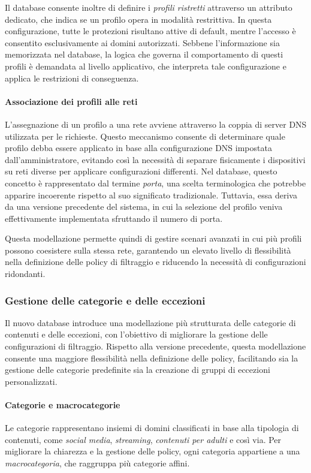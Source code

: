Il database consente inoltre di definire i \emph{profili ristretti} attraverso un attributo dedicato, che indica se un profilo opera in modalità restrittiva. In questa configurazione, tutte le protezioni risultano attive di default, mentre l’accesso è consentito esclusivamente ai domini autorizzati. Sebbene l’informazione sia memorizzata nel database, la logica che governa il comportamento di questi profili è demandata al livello applicativo, che interpreta tale configurazione e applica le restrizioni di conseguenza.

\paragraph{Associazione dei profili alle reti}
L’assegnazione di un profilo a una rete avviene attraverso la coppia di server DNS utilizzata per le richieste. Questo meccanismo consente di determinare quale profilo debba essere applicato in base alla configurazione DNS impostata dall’amministratore, evitando così la necessità di separare fisicamente i dispositivi su reti diverse per applicare configurazioni differenti. Nel database, questo concetto è rappresentato dal termine \emph{porta}, una scelta terminologica che potrebbe apparire incoerente rispetto al suo significato tradizionale. Tuttavia, essa deriva da una versione precedente del sistema, in cui la selezione del profilo veniva effettivamente implementata sfruttando il numero di porta.

Questa modellazione permette quindi di gestire scenari avanzati in cui più profili possono coesistere sulla stessa rete, garantendo un elevato livello di flessibilità nella definizione delle policy di filtraggio e riducendo la necessità di configurazioni ridondanti.

\subsubsection{Gestione delle categorie e delle eccezioni}
Il nuovo database introduce una modellazione più strutturata delle categorie di contenuti e delle eccezioni, con l'obiettivo di migliorare la gestione delle configurazioni di filtraggio. Rispetto alla versione precedente, questa modellazione consente una maggiore flessibilità nella definizione delle policy, facilitando sia la gestione delle categorie predefinite sia la creazione di gruppi di eccezioni personalizzati.

\paragraph{Categorie e macrocategorie}
Le categorie rappresentano insiemi di domini classificati in base alla tipologia di contenuti, come \emph{social media}, \emph{streaming}, \emph{contenuti per adulti} e così via. Per migliorare la chiarezza e la gestione delle policy, ogni categoria appartiene a una \emph{macrocategoria}, che raggruppa più categorie affini.

